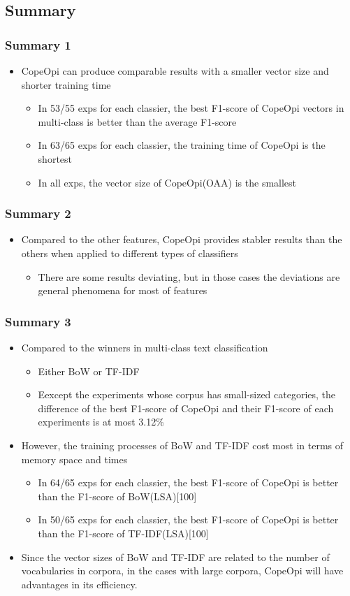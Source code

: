 \documentclass[mathserif]{beamer}
\begin{document}
\subsection{Summary}
\begin{frame}
\frametitle{Summary 1}
	\begin{itemize}
	\item CopeOpi can produce comparable results with a smaller vector size and shorter training time
		\begin{itemize}
		\item In 53/55 exps for each classier, the best F1-score of CopeOpi vectors in multi-class is better than the average F1-score
		\item In 63/65 exps for each classier, the training time of CopeOpi is the shortest
		\item In all exps, the vector size of CopeOpi(OAA) is the smallest
		\end{itemize}
	\end{itemize}
\end{frame}

\begin{frame}
\frametitle{Summary 2}
	\begin{itemize}
	\item Compared to the other features, CopeOpi provides stabler results than the others when applied to
different types of classifiers
		\begin{itemize}
		\item There are some results deviating, but in those cases the deviations are general phenomena for most of features
		\end{itemize}
	\end{itemize}
\end{frame}

\begin{frame}
\frametitle{Summary 3}
	\begin{itemize}
	\item Compared to the winners in multi-class text classification
		\begin{itemize}
		\item Either BoW or TF-IDF
		\item Eexcept the experiments whose corpus has small-sized categories, the difference of the best F1-score of CopeOpi and their F1-score of each experiments is at most 3.12\%
		\end{itemize}
	\item However, the training processes of BoW and TF-IDF cost most in terms of memory space and times
		\begin{itemize}
		\item In 64/65 exps for each classier, the best F1-score of CopeOpi is better than the F1-score of BoW(LSA)[100]
		\item In 50/65 exps for each classier, the best F1-score of CopeOpi is better than the F1-score of TF-IDF(LSA)[100]
		\end{itemize}
	\item Since the vector sizes of BoW and TF-IDF are
related to the number of vocabularies in corpora, in the cases with large corpora, CopeOpi will have
advantages in its efficiency.
	\end{itemize}
\end{frame}
\end{document}
